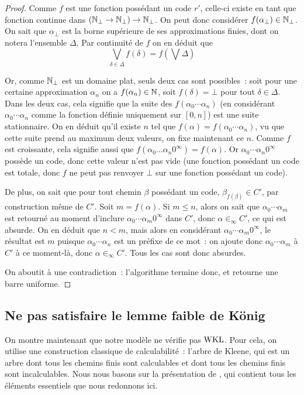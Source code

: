 \documentclass{article}
\begin{document}
\begin{proof}
    Comme $f$ est une fonction possédant un code $r'$, celle-ci existe en tant que fonction continue dans $(\mathbb{N}_\bot\to\mathbb{N}_\bot)\to\mathbb{N}_\bot$. On peut donc considérer $f(\alpha_\bot)\in\mathbb{N}_\bot$. On sait que $\alpha_\bot$ est la borne supérieure de ses approximations finies, dont on notera l'ensemble $\Delta$. Par continuité de $f$ on en déduit que
    \[\bigvee_{\delta \in \Delta} f(\delta) = f\left(\bigvee \Delta\right)\]

    Or, comme $\mathbb{N}_\bot$ est un domaine plat, seuls deux cas sont possibles~: soit pour une certaine approximation $\alpha_n$ on a $f(\alpha_n) \in \mathbb{N}$, soit $f(\delta) = \bot$ pour tout $\delta\in\Delta$. Dans les deux cas, cela signifie que la suite des $f(\alpha_0\cdots \alpha_n)$ (en considérant $\alpha_0\cdots\alpha_n$ comme la fonction définie uniquement sur $[0,n]$) est une suite stationnaire. On en déduit qu'il existe $n$ tel que $f(\alpha) = f(\alpha_0\cdots \alpha_n)$, vu que cette suite prend au maximum deux valeurs, on fixe maintenant ce $n$. Comme $f$ est croissante, cela signifie aussi que $f(\alpha_0\ldots\alpha_n 0^\infty) = f(\alpha)$. Or $\alpha_0\cdots\alpha_n 0^\infty$ possède un code, donc cette valeur n'est pas vide (une fonction possédant un code est totale, donc $f$ ne peut pas renvoyer $\bot$ sur une fonction possédant un code).

    De plus, on sait que pour tout chemin $\beta$ possédant un code, $\beta_{f(\beta)} \in C'$, par construction même de $C'$. Soit $m = f(\alpha)$. Si $m \leq n$, alors on sait que $\alpha_0\cdots \alpha_m$ est retourné au moment d'inclure $\alpha_0\cdots\alpha_m 0^\infty$ dans $C'$, donc $\alpha \in_\infty C'$, ce qui est absurde. On en déduit que $n < m$, mais alors en considérant $\alpha_0\cdots \alpha_m 0^\infty$, le résultat est $m$ puisque $\alpha_0\cdots \alpha_n$ est un préfixe de ce mot~: on ajoute donc $\alpha_0\cdots \alpha_m$ à $C'$ à ce moment-là, donc $\alpha \in_\infty C'$. Tous les cas sont donc absurdes.

    On aboutit à une contradiction~: l'algorithme termine donc, et retourne une barre uniforme.
\end{proof}

\subsection[Lemme faible de König]{Ne pas satisfaire le lemme faible de König}

On montre maintenant que notre modèle ne vérifie pas $\mathrm{WKL}$. Pour cela, on utilise une construction classique de calculabilité~: l'arbre de Kleene, qui est un arbre dont tous les chemins finis sont calculables et dont tous les chemins finis sont incalculables. Nous nous basons sur la présentation de \cite{bauer-kleene-tree}, qui contient tous les éléments essentiels que nous redonnons ici.
\end{document}
